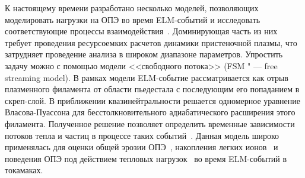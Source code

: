 
К настоящему времени разработано несколько моделей, позволяющих моделировать нагрузки на ОПЭ во время ELM-событий и исследовать соответствующие процессы взаимодействия~\cite{Krieger2025,Leonard2014,zohm1996edge}. Доминирующая часть из них требует проведения ресурсоемких расчетов динамики пристеночной плазмы, что затрудняет проведение анализа в широком диапазоне параметров. Упростить задачу можно с помощью модели <<свободного потока>> (FSM " --- free streaming model). В рамках модели ELM-событие рассматривается как отрыв плазменного филамента от области пьедестала с последующим его попаданием в скреп-слой. В приближении квазинейтральности решается одномерное уравнение Власова-Пуассона для бесстолкновительного адиабатического расширения этого филамента. Полученное решение позволяет определить временные зависимости потоков тепла и частиц в процессе таких событий~\cite{Fundamenski2006, Moulton2013}. Данная модель широко применялась для оценки общей эрозии ОПЭ~\cite{Abrams2018, Wang2024}, накопления легких ионов~\cite{Dasgupta2023} и поведения ОПЭ под действием тепловых нагрузок~\cite{VandenKerkhof2021} во время ELM-событий в токамаках.


